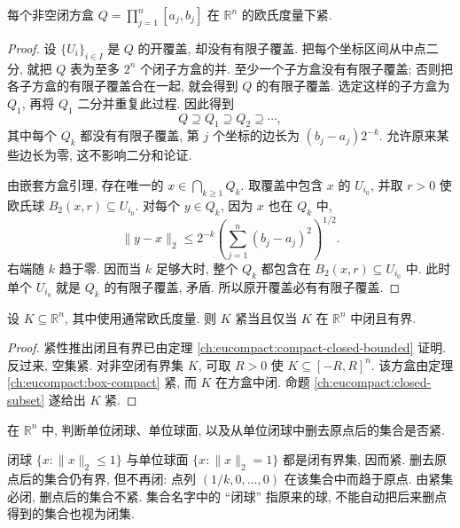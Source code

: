 \begin{theorem}[闭方盒的紧性]
\label{ch:eucompact:box-compact}
每个非空闭方盒 $Q=\prod_{j=1}^n[a_j,b_j]$ 在 $\mathbb{R}^n$ 的欧氏度量下紧.
\end{theorem}
\begin{proof}
设 $\{U_i\}_{i\in I}$ 是 $Q$ 的开覆盖, 却没有有限子覆盖. 把每个坐标区间从中点二分, 就把 $Q$ 表为至多 $2^n$ 个闭子方盒的并. 至少一个子方盒没有有限子覆盖; 否则把各子方盒的有限子覆盖合在一起, 就会得到 $Q$ 的有限子覆盖. 选定这样的子方盒为 $Q_1$, 再将 $Q_1$ 二分并重复此过程. 因此得到
\[
 Q\supseteq Q_1\supseteq Q_2\supseteq\cdots,
\]
其中每个 $Q_k$ 都没有有限子覆盖, 第 $j$ 个坐标的边长为 $(b_j-a_j)2^{-k}$. 允许原来某些边长为零, 这不影响二分和论证.

由嵌套方盒引理, 存在唯一的 $x\in\bigcap_{k\geq1}Q_k$. 取覆盖中包含 $x$ 的 $U_{i_0}$, 并取 $r>0$ 使欧氏球 $B_2(x,r)\subseteq U_{i_0}$. 对每个 $y\in Q_k$, 因为 $x$ 也在 $Q_k$ 中,
\[
 \|y-x\|_2\leq
 2^{-k}\left(\sum_{j=1}^n(b_j-a_j)^2\right)^{1/2}.
\]
右端随 $k$ 趋于零. 因而当 $k$ 足够大时, 整个 $Q_k$ 都包含在 $B_2(x,r)\subseteq U_{i_0}$ 中. 此时单个 $U_{i_0}$ 就是 $Q_k$ 的有限子覆盖, 矛盾. 所以原开覆盖必有有限子覆盖.
\end{proof}

\begin{theorem}
\label{ch:eucompact:heine-borel}
设 $K\subseteq\mathbb{R}^n$, 其中使用通常欧氏度量. 则 $K$ 紧当且仅当 $K$ 在 $\mathbb{R}^n$ 中闭且有界.
\end{theorem}
\begin{proof}
紧性推出闭且有界已由定理 \ref{ch:eucompact:compact-closed-bounded} 证明. 反过来, 空集紧. 对非空闭有界集 $K$, 可取 $R>0$ 使 $K\subseteq[-R,R]^n$. 该方盒由定理 \ref{ch:eucompact:box-compact} 紧, 而 $K$ 在方盒中闭. 命题 \ref{ch:eucompact:closed-subset} 遂给出 $K$ 紧.
\end{proof}

\begin{example}
在 $\mathbb{R}^n$ 中, 判断单位闭球、单位球面, 以及从单位闭球中删去原点后的集合是否紧.
\end{example}
\begin{solution}
闭球 $\{x:\|x\|_2\leq1\}$ 与单位球面 $\{x:\|x\|_2=1\}$ 都是闭有界集, 因而紧. 删去原点后的集合仍有界, 但不再闭: 点列 $(1/k,0,\ldots,0)$ 在该集合中而趋于原点. 由紧集必闭, 删点后的集合不紧. 集合名字中的 ``闭球'' 指原来的球, 不能自动把后来删点得到的集合也视为闭集.
\end{solution}

\label{ch:eucompact:bolzano-weierstrass}

